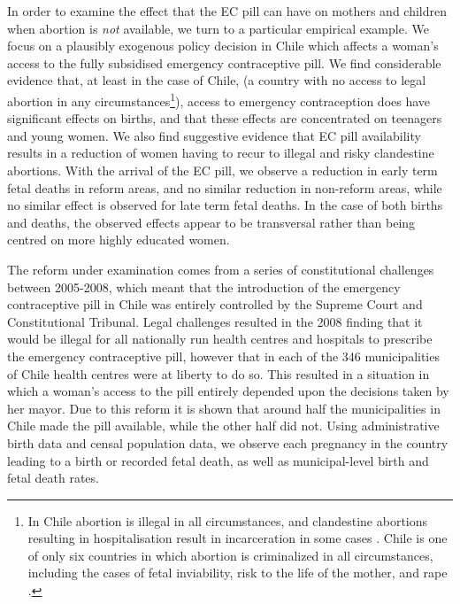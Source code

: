 In order to examine the effect that the EC pill can have on mothers and children 
when abortion is \emph{not} available, we turn to a particular empirical example.  
We focus on a plausibly exogenous policy decision in Chile which affects a 
woman's access to the fully subsidised emergency contraceptive pill.  We find 
considerable evidence that, at least in the case of Chile, (a country with no 
access to legal abortion in any circumstances\footnote{In Chile abortion is 
illegal in all circumstances, and clandestine abortions resulting in 
hospitalisation result in incarceration in some cases \citep{ShepardCasas2007}.  
Chile is one of only six countries in which abortion is criminalized in all 
circumstances, including the cases of fetal inviability, risk to the life of the 
mother, and rape \citep{UN2014}.}), access to emergency contraception does have 
significant effects on births, and that these effects are concentrated on 
teenagers and young women.  We also find suggestive evidence that EC 
pill availability results in a reduction of women having to recur to illegal and 
risky clandestine abortions.  With the arrival of the EC pill, we 
observe a reduction in early term fetal deaths in reform areas, and no similar 
reduction in non-reform areas, while no similar effect is observed for late term 
fetal deaths.  In the case of both births and deaths, the observed effects appear 
to be transversal rather than being centred on more highly educated women.

The reform under examination comes from a series of constitutional challenges 
between 2005-2008, which meant that the introduction of the emergency contraceptive 
pill in Chile was entirely controlled by the Supreme Court and Constitutional 
Tribunal.  Legal challenges resulted in the 2008 finding that it would be illegal 
for all nationally run health centres and hospitals to prescribe the emergency 
contraceptive pill, however that in each of the 346 municipalities of Chile health 
centres were at liberty to do so.  This resulted  in a situation in which a woman's 
access to the pill entirely depended upon the decisions taken by her mayor.  Due 
to this reform it is shown that around half the municipalities in Chile made the 
pill available, while the other half did not.  Using administrative birth data and 
censal population data, we observe each pregnancy in the country leading to a birth
or recorded fetal death, as well as municipal-level birth and fetal death rates.

